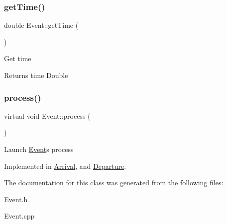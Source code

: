 \subsubsection{\texorpdfstring{get\+Time()}{getTime()}}
{\footnotesize\ttfamily double Event\+::get\+Time (\begin{DoxyParamCaption}{ }\end{DoxyParamCaption})}

Get time \begin{DoxyReturn}{Returns}
time Double 
\end{DoxyReturn}
\mbox{\label{classEvent_af1940e82c4da67c8119f0dfe026949b4}} 
\subsubsection{\texorpdfstring{process()}{process()}}
{\footnotesize\ttfamily virtual void Event\+::process (\begin{DoxyParamCaption}{ }\end{DoxyParamCaption})\hspace{0.3cm}{\ttfamily [pure virtual]}}

Launch \hyperlink{classEvent}{Event}\textquotesingle{}s process 

Implemented in \hyperlink{classArrival_ad7da9fd4613164ece60d63be1bac6f1d}{Arrival}, and \hyperlink{classDeparture_a241611bdf4255d2ba868d58128dddc68}{Departure}.



The documentation for this class was generated from the following files\+:\begin{DoxyCompactItemize}
\item 
Event.\+h\item 
Event.\+cpp\end{DoxyCompactItemize}

